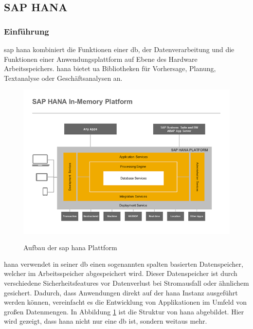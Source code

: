 \subsection{SAP HANA}
\label{sec:db-hana}

\subsubsection{Einführung}
\label{sec:db-hana-intro}
\gls{sap} \gls{hana} kombiniert die Funktionen einer \gls{db}, der Datenverarbeitung und die Funktionen einer Anwendungsplattform auf Ebene des Hardware Arbeitsspeichers. \gls{hana} bietet \gls{ua} Bibliotheken für Vorhersage, Planung, Textanalyse oder Geschäftsanalysen an.\\

\begin{figure}[H]
	\begin{center}
	\includegraphics[width=1\linewidth]{grafiken/hana-features-overview.png}
	\vspace{-20pt}
	\caption{Aufbau der \gls{sap} \gls{hana} Plattform \cite{SAPHanaAbout}}
	\vspace{-10pt}
	\label{abb:SAPHanaAbout}
	\end{center}
\end{figure}

\gls{hana} verwendet in seiner \gls{db} einen sogenannten spalten basierten Datenspeicher, welcher im Arbeitsspeicher abgespeichert wird. Dieser Datenspeicher ist durch verschiedene Sicherheitsfeatures vor Datenverlust bei Stromausfall oder ähnlichem gesichert.
Dadurch, dass Anwendungen direkt auf der \gls{hana} Instanz ausgeführt werden können, vereinfacht es die Entwicklung von Applikationen im Umfeld von großen Datenmengen. In Abbildung \ref{abb:SAPHanaAbout} ist die Struktur von \gls{hana} abgebildet. Hier wird gezeigt, dass \gls{hana} nicht nur eine \gls{db} ist, sondern weitaus mehr.

